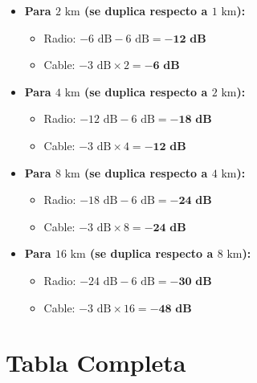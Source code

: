 \documentclass[11pt,a4paper]{article}
\begin{document}
\begin{enumerate}[label=4.\arabic*), itemsep=0.3cm]
\begin{itemize}
          \item \textbf{Para $2\text{ km}$ (se duplica respecto a $1\text{ km}$):}
                \begin{itemize}
                  \item Radio: $-6\text{ dB} - 6\text{ dB} = \mathbf{-12\text{ dB}}$
                  \item Cable: $-3\text{ dB} \times 2 = \mathbf{-6\text{ dB}}$
                \end{itemize}

          \item \textbf{Para $4\text{ km}$ (se duplica respecto a $2\text{ km}$):}
                \begin{itemize}
                  \item Radio: $-12\text{ dB} - 6\text{ dB} = \mathbf{-18\text{ dB}}$
                  \item Cable: $-3\text{ dB} \times 4 = \mathbf{-12\text{ dB}}$
                \end{itemize}

          \item \textbf{Para $8\text{ km}$ (se duplica respecto a $4\text{ km}$):}
                \begin{itemize}
                  \item Radio: $-18\text{ dB} - 6\text{ dB} = \mathbf{-24\text{ dB}}$
                  \item Cable: $-3\text{ dB} \times 8 = \mathbf{-24\text{ dB}}$
                \end{itemize}

          \item \textbf{Para $16\text{ km}$ (se duplica respecto a $8\text{ km}$):}
                \begin{itemize}
                  \item Radio: $-24\text{ dB} - 6\text{ dB} = \mathbf{-30\text{ dB}}$
                  \item Cable: $-3\text{ dB} \times 16 = \mathbf{-48\text{ dB}}$
                \end{itemize}
        \end{itemize}

        \section*{Tabla Completa}


\end{enumerate}
\end{document}
